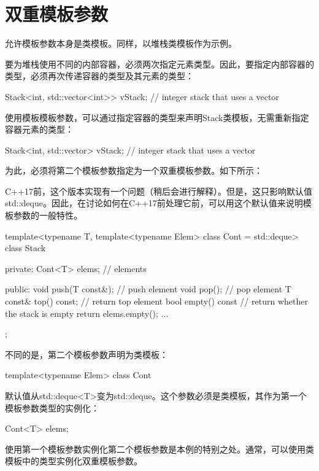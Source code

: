 \section{双重模板参数}
允许模板参数本身是类模板。同样，以堆栈类模板作为示例。

要为堆栈使用不同的内部容器，必须两次指定元素类型。因此，要指定内部容器的类型，必须再次传递容器的类型及其元素的类型：

\begin{cpp}
Stack<int, std::vector<int>> vStack; // integer stack that uses a vector
\end{cpp}

使用模板模板参数，可以通过指定容器的类型来声明Stack类模板，无需重新指定容器元素的类型：

\begin{cpp}
Stack<int, std::vector> vStack; // integer stack that uses a vector
\end{cpp}

为此，必须将第二个模板参数指定为一个双重模板参数。如下所示：

\begin{notice}
C++17前，这个版本实现有一个问题（稍后会进行解释）。但是，这只影响默认值std::deque。因此，在讨论如何在C++17前处理它前，可以用这个默认值来说明模板参数的一般特性。
\end{notice}

\begin{cpp}
template<typename T,
		template<typename Elem> class Cont = std::deque>
class Stack {
private:
	Cont<T> elems; // elements
	
public:
	void push(T const&); // push element
	void pop(); // pop element
	T const& top() const; // return top element
	bool empty() const { // return whether the stack is empty
		return elems.empty();
	}
	...
};
\end{cpp}

不同的是，第二个模板参数声明为类模板：

\begin{cpp}
template<typename Elem> class Cont
\end{cpp}

默认值从std::deque<T>变为std::deque。这个参数必须是类模板，其作为第一个模板参数类型的实例化：

\begin{cpp}
Cont<T> elems;
\end{cpp}

使用第一个模板参数实例化第二个模板参数是本例的特别之处。通常，可以使用类模板中的类型实例化双重模板参数。

